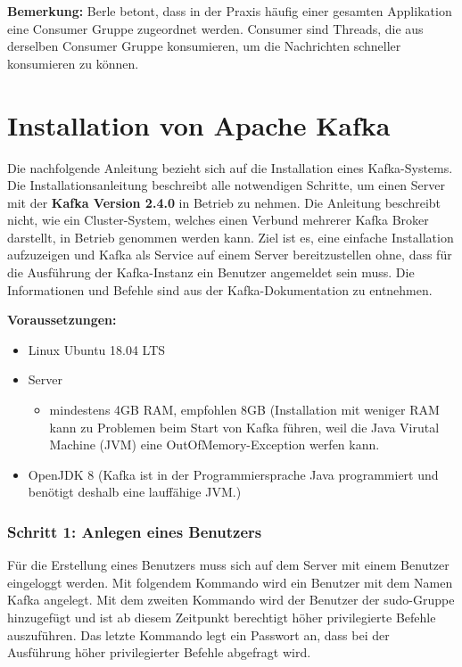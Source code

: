 \documentclass[a4paper,titlepage,halfparskip,12pt]{scrreprt}
\begin{document}
\begin{onehalfspacing}
\textbf{Bemerkung:} Berle \cite{berleKafkaOverview} betont, dass in der Praxis häufig einer gesamten Applikation eine Consumer Gruppe zugeordnet werden. Consumer sind Threads, die aus derselben Consumer Gruppe konsumieren, um die Nachrichten schneller konsumieren zu können.

\pagebreak

\section{Installation von Apache Kafka}
\label{sec:InstallationKafka}

Die nachfolgende Anleitung bezieht sich auf die Installation eines Kafka-Systems. Die Installationsanleitung beschreibt alle notwendigen Schritte, um einen Server mit der \textbf{Kafka Version 2.4.0} in Betrieb zu nehmen. Die Anleitung beschreibt nicht, wie ein Cluster-System, welches einen Verbund mehrerer Kafka Broker darstellt, in Betrieb genommen werden kann. Ziel ist es, eine einfache Installation aufzuzeigen und Kafka als Service auf einem Server bereitzustellen ohne, dass für die Ausführung der Kafka-Instanz ein Benutzer angemeldet sein muss. Die Informationen und Befehle sind aus der Kafka-Dokumentation \cite{kafkaDoc} zu entnehmen.

\bigskip

\textbf{Voraussetzungen:}

\smallskip

\begin{itemize}
\item Linux Ubuntu 18.04 LTS
\item Server
\begin{itemize}
\item mindestens 4GB RAM, empfohlen 8GB (Installation mit weniger RAM kann zu Problemen beim Start von Kafka führen, weil die Java Virutal Machine (JVM) eine \glqq OutOfMemory\grqq -Exception werfen kann.
\end{itemize}
\item OpenJDK 8 (Kafka ist in der Programmiersprache Java programmiert und benötigt deshalb eine lauffähige JVM.)
\end{itemize}

\subsubsection*{Schritt 1: Anlegen eines Benutzers}

Für die Erstellung eines Benutzers muss sich auf dem Server mit einem Benutzer eingeloggt werden. Mit folgendem Kommando wird ein Benutzer mit dem Namen Kafka angelegt. Mit dem zweiten Kommando wird der Benutzer der \glqq sudo\grqq -Gruppe hinzugefügt und ist ab diesem Zeitpunkt berechtigt höher privilegierte Befehle auszuführen. Das letzte Kommando legt ein Passwort an, dass bei der Ausführung höher privilegierter Befehle abgefragt wird.


\end{onehalfspacing}
\end{document}
